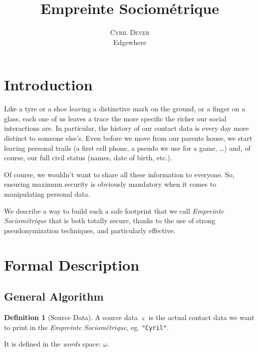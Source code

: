\documentclass[twoside,twocolumn]{article}
\title{Empreinte Sociométrique} %
\author{%
    \textsc{Cyril Dever}\\ %
    \normalsize Edgewhere \\ %
}
\date{\DTMusedate{thedate}}
\theoremstyle{definition}
\newtheorem{definition}{Definition}
\theoremstyle{remark}
\begin{document}
\maketitle


\section{Introduction}

\lettrine[nindent=0em,lines=3]{L}ike a tyre or a shoe leaving a distinctive mark on the ground, or a finger on a glass, each one of 
us leaves a trace the more specific the richer our social interactions are. In particular, the history of our contact data is every 
day more distinct to someone else's. Even before we move from our parents house, we start leaving personal trails (a first cell 
phone, a pseudo we use for a game, \dots) and, of course, our full civil status (names, date of birth, etc.).

Of course, we wouldn't want to share all these information to everyone. So, ensuring maximum security is obviously mandatory when 
it comes to manipulating personal data.

We describe a way to build such a safe footprint that we call \emph{Empreinte Sociométrique}\cite{empreinteSociometrique:cyd} that 
is both totally secure, thanks to the use of strong pseudonymization techniques, and particularly effective.


\section{Formal Description}

\subsection{General Algorithm}

\begin{definition}[Source Data]
    \label{sourceData}
    A source data $\varsigma$ is the actual contact data we want to print in the \emph{Empreinte Sociométrique}, eg. \texttt{"Cyril"}.
    
    It is defined in the \emph{words} space: $\omega$.
\end{definition}
\end{document}
